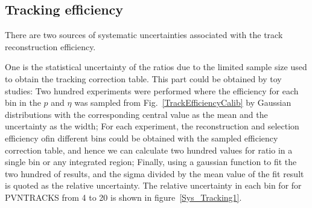 \subsection{Tracking efficiency}
\label{sec:SysTracking}
There are two sources of systematic uncertainties associated with the track reconstruction efficiency. 

One is the statistical uncertainty of the ratios due to the limited sample size used to obtain the tracking correction table.
This part could be obtained by toy studies: 
Two hundred experiments were performed where the efficiency for each bin in the $p$ and $\eta$ was sampled from Fig.~\ref{TrackEfficiencyCalib} by Gaussian distributions with the corresponding central value as the mean and the uncertainty as the width; 
For each experiment, the reconstruction and selection efficiency of\pandb in different bins could be obtained with the sampled efficiency correction table, and hence we can calculate two hundred values for ratio in a single bin or any integrated region; 
Finally, using a gaussian function to fit the two hundred of results, and the sigma divided by the mean value of the fit result is quoted as the relative uncertainty. 
The relative uncertainty in each bin for \pandb for PVNTRACKS from 4 to 20 is shown in figure~\ref{Sys_Tracking1}.
